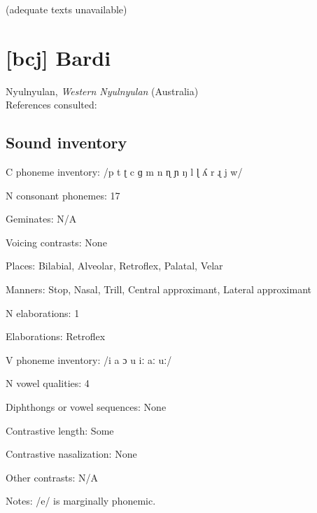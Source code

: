 {(adequate texts unavailable)

\section*{[bcj] Bardi}  %
Nyulnyulan, \textit{Western Nyulnyulan} (Australia)\medskip\\
References consulted: \citet{Bowern2012}

\subsection*{Sound inventory}
\begin{appendixdesc}

\item[C phoneme inventory:] /p t ʈ c ɡ m n ɳ ɲ ŋ l ɭ ʎ r ɻ j w/

\item[N consonant phonemes:] 17

\item[Geminates:] N/A

\item[Voicing contrasts:] None

\item[Places:] Bilabial, Alveolar, Retroflex, Palatal, Velar

\item[Manners:] Stop, Nasal, Trill, Central approximant, Lateral approximant

\item[N elaborations:] 1

\item[Elaborations:] Retroflex

\item[V phoneme inventory:] /i a ɔ u iː aː uː/

\item[N vowel qualities:] 4

\item[Diphthongs or vowel sequences:] None

\item[Contrastive length:] Some

\item[Contrastive nasalization:] None

\item[Other contrasts:] N/A

\item[Notes:] /e/ is marginally phonemic.
\end{appendixdesc}
}
